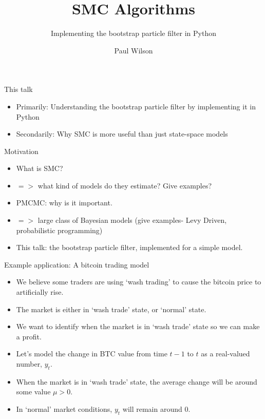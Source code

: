 \documentclass[pdf]
{beamer}
\title{SMC Algorithms}
\subtitle{Implementing the bootstrap particle filter in Python}
\author{Paul Wilson}
\begin{document}


\begin{frame}
\titlepage
\end{frame}

\begin{frame}{This talk}
\begin{itemize}
	\item Primarily: Understanding the bootstrap particle filter by implementing it in Python
	\item Secondarily: Why SMC is more useful than just state-space models
\end{itemize}
\end{frame}

\begin{frame}{Motivation}
\begin{itemize}
	\item What is SMC?
	\item $=>$ what kind of models do they estimate? Give examples?
	\item PMCMC: why is it important.
	\item $=>$ large class of Bayesian models (give examples- Levy Driven, probabilistic programming)
	\item This talk: the bootstrap particle filter, implemented for a simple model.
\end{itemize}
\end{frame}

\begin{frame}{Example application: A bitcoin trading model}
\begin{itemize}
	\item We believe some traders are using `wash trading' to cause the bitcoin price to artificially rise.
	\item The market is either in `wash trade' state, or `normal' state.
	\item We want to identify when the market is in `wash trade' state so we can make a profit.
	\item Let's model the change in BTC value from time $t - 1$ to $t$ as a real-valued number, $y_t$.
	\item When the market is in `wash trade' state, the average change will be around some value $\mu > 0$.
	\item In `normal' market conditions, $y_t$ will remain around $0$.
\end{itemize}
\end{frame}
\end{document}

